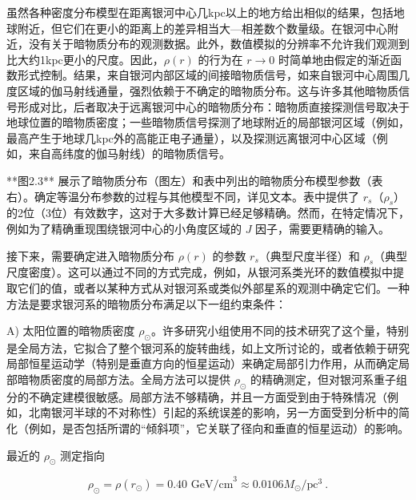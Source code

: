 虽然各种密度分布模型在距离银河中心几kpc以上的地方给出相似的结果，包括地球附近，但它们在更小的距离上的差异相当大—相差数个数量级。在银河中心附近，没有关于暗物质分布的观测数据。此外，数值模拟的分辨率不允许我们观测到比大约1kpc更小的尺度。因此，\( \rho(r) \) 的行为在 \( r \to 0 \) 时简单地由假定的渐近函数形式控制。结果，来自银河内部区域的间接暗物质信号，如来自银河中心周围几度区域的伽马射线通量，强烈依赖于不确定的暗物质分布。这与许多其他暗物质信号形成对比，后者取决于远离银河中心的暗物质分布：暗物质直接探测信号取决于地球位置的暗物质密度；一些暗物质信号探测了地球附近的局部银河区域（例如，最高产生于地球几kpc外的高能正电子通量），以及探测远离银河中心区域（例如，来自高纬度的伽马射线）的暗物质信号。

**图2.3** 展示了暗物质分布（图左）和表中列出的暗物质分布模型参数（表右）。确定等温分布参数的过程与其他模型不同，详见文本。表中提供了 \( r_s \)（\( \rho_s \)）的2位（3位）有效数字，这对于大多数计算已经足够精确。然而，在特定情况下，例如为了精确重现围绕银河中心的小角度区域的 \( J \) 因子，需要更精确的输入。

接下来，需要确定进入暗物质分布 \( \rho(r) \) 的参数 \( r_s \)（典型尺度半径）和 \( \rho_s \)（典型尺度密度）。这可以通过不同的方式完成，例如，从银河系类光环的数值模拟中提取它们的值，或者以某种方式从对银河系或类似外部星系的观测中确定它们。一种方法是要求银河系的暗物质分布满足以下一组约束条件：

A) 太阳位置的暗物质密度 \( \rho_\odot \)。许多研究小组使用不同的技术研究了这个量，特别是全局方法，它拟合了整个银河系的旋转曲线，如上文所讨论的，或者依赖于研究局部恒星运动学（特别是垂直方向的恒星运动）来确定局部引力作用，从而确定局部暗物质密度的局部方法。全局方法可以提供 \( \rho_\odot \) 的精确测定，但对银河系重子组分的不确定建模很敏感。局部方法不够精确，并且一方面受到由于特殊情况（例如，北南银河半球的不对称性）引起的系统误差的影响，另一方面受到分析中的简化（例如，是否包括所谓的“倾斜项”，它关联了径向和垂直的恒星运动）的影响。

最近的 \( \rho_\odot \) 测定指向

\[ \rho_\odot = \rho(r_\odot) = 0.40 \text{ GeV/cm}^3 \approx 0.0106 M_\odot/\text{pc}^3 ~. \]





